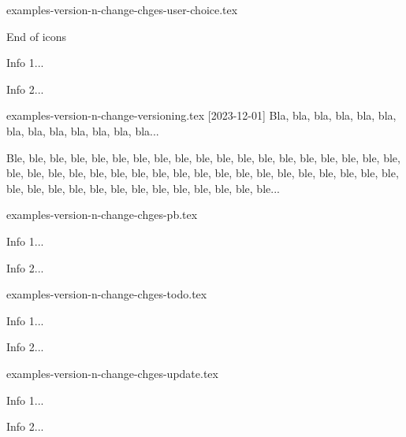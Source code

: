 \begin{filecontents*}[overwrite]{examples-version-n-change-chges-user-choice.tex}
\begin{tdoctopic}{End of icons}
    \item Info 1...
    \item Info 2...
\end{tdoctopic}
\end{filecontents*}


\begin{filecontents*}[overwrite]{examples-version-n-change-versioning.tex}
[2023-12-01]
Bla, bla, bla, bla, bla, bla, bla, bla, bla, bla, bla, bla, bla...

\smallskip\bigskip %

Ble, ble, ble, ble, ble, ble, ble, ble, ble, ble, ble, ble, ble,
ble, ble, ble, ble, ble, ble, ble, ble, ble, ble, ble, ble, ble,
ble, ble, ble, ble, ble, ble, ble, ble, ble, ble, ble, ble, ble,
ble, ble, ble, ble, ble, ble, ble, ble, ble, ble, ble, ble...
\end{filecontents*}


\begin{filecontents*}[overwrite]{examples-version-n-change-chges-pb.tex}
\begin{tdocprob}
    \item Info 1...
    \item Info 2...
\end{tdocprob}
\end{filecontents*}


\begin{filecontents*}[overwrite]{examples-version-n-change-chges-todo.tex}
\begin{tdoctodo}
    \item Info 1...
    \item Info 2...
\end{tdoctodo}
\end{filecontents*}


\begin{filecontents*}[overwrite]{examples-version-n-change-chges-update.tex}
\begin{tdocupdate}
    \item Info 1...
    \item Info 2...
\end{tdocupdate}
\end{filecontents*}


